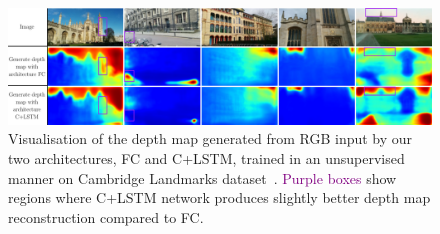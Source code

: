 \begin{landscape}
\begin{figure}
    \centering

	\includegraphics[width=\linewidth]{results/outdoor/depth_maps}
	\caption[Generated outdoor depth maps]{\label{fig:depth_map_outdoor} Visualisation of the depth map generated from RGB input by our two architectures, FC and C+LSTM, trained in an unsupervised manner on Cambridge Landmarks dataset~\citep{Kendall2015}. \textcolor{purple}{Purple boxes} show regions where C+LSTM network produces slightly better depth map reconstruction compared to FC.}
	
\end{figure}
\end{landscape}